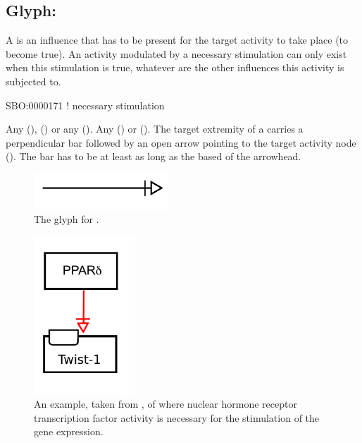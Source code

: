 \subsection{Glyph: }
\label{sec:af:trigger}
A  is an influence that has to be present for the target activity to take place (to become true).  An activity modulated by a necessary stimulation can only exist when this stimulation is true, whatever are the other influences this activity is subjected to.

\begin{glyphDescription}

\glyphSboTerm SBO:0000171 ! necessary stimulation

  \glyphOrigin Any  (),   () or any  ().
 \glyphTarget Any  () or  ().
 \glyphEndPoint The target extremity of a  carries a perpendicular bar followed by an open arrow pointing to the target activity node ().  The bar has to be at least as long as the based of the arrowhead.

\end{glyphDescription}

\begin{figure}[H]
  \centering
  \includegraphics[width = 2in]{images/necessaryStimulation}
  \caption{The \AF glyph for .}
  \label{fig:af:trigger}
\end{figure}

\begin{figure}[H]
  \centering
  \includegraphics[width = 1.5in]{examples/ex-necessaryStimulation}
  \caption{An example, taken from , of  where nuclear hormone receptor  transcription factor activity is necessary for the stimulation of the  gene expression. }
  \label{fig:af:ex-NS}
\end{figure}
